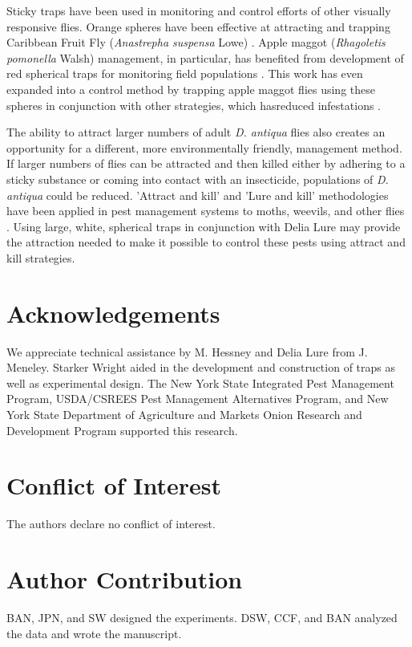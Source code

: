 \documentclass[alpha-refs]{wiley-article}
\begin{document}
Sticky traps have been used in monitoring and control efforts of other visually responsive flies.  Orange spheres have been effective at attracting and trapping Caribbean Fruit Fly (\textit{Anastrepha suspensa} Lowe) \citep{sivinski1990colored}.  Apple maggot (\textit{Rhagoletis pomonella} Walsh) management, in particular, has benefited from development of red spherical traps for monitoring field populations \citep{prokopy1975apple, drummond1984comparative, duan1994apple}.  This work has even expanded into a control method by trapping apple maggot flies using these spheres in conjunction with other strategies, which hasreduced infestations \citep{bostanian1999managing}.  

The ability to attract larger numbers of adult \textit{D. antiqua} flies also creates an opportunity for a different, more environmentally friendly, management method. If larger numbers of flies can be attracted and then killed either by adhering to a sticky substance or coming into contact with an insecticide, populations of \textit{D. antiqua} could be reduced.  'Attract and kill' and 'Lure and kill' methodologies have been applied in pest management systems to moths, weevils, and other flies \citep{el2009potential,el2011bait,navarro2013efficacy,charmillot2000attract}.  Using large, white, spherical traps in conjunction with Delia Lure may provide the attraction needed to make it possible to control these pests using attract and kill strategies.  



\section*{Acknowledgements}
We appreciate technical assistance by M. Hessney and Delia Lure from J. Meneley. Starker Wright aided in the development and construction of traps as well as experimental design. The New York State Integrated Pest Management Program, USDA/CSREES Pest Management Alternatives Program, and New York State Department of Agriculture and Markets Onion Research and Development Program supported this research.  

\section*{Conflict of Interest}
The authors declare no conflict of interest.  

\section*{Author Contribution}
BAN, JPN, and SW designed the experiments.  DSW, CCF, and BAN analyzed the data and wrote the manuscript.  
\end{document}
